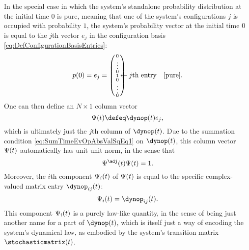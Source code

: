 \documentclass[12pt,english,prl,superscriptaddress,nobibnotes,nofootinbib]{revtex4-2}
\let\originalleft\left
\let\originalright\right
\renewcommand{\left}{\mathopen{}\mathclose\bgroup\originalleft}
\renewcommand{\right}{\aftergroup\egroup\originalright}
\begin{document}
In the special case in which the system's standalone probability distribution
at the initial time $0$ is pure, meaning that one of the system's
configurations $j$ is occupied with probability $1$, the system's
probability vector at the initial time $0$ is equal to the $j$th
vector $e_{j}$ in the configuration basis \eqref{eq:DefConfigurationBasisEntries}:
\begin{equation}
p\left(0\right)=e_{j}=\left(\begin{smallmatrix}0\\
\vdots\\
0\\
1\\
0\\
\vdots\\
0
\end{smallmatrix}\right)\negthickspace\negthickspace\negthickspace\negthickspace\leftarrow j\textrm{th entry}\quad\left[\textrm{pure}\right].\label{eq:PureInitialProbabilityVector}
\end{equation}
 One can then define an $N\times1$ column vector 
\begin{equation}
\Psi\left(t\right)\defeq\dynop\left(t\right)e_{j},\label{eq:DefStateVector}
\end{equation}
 which is ultimately just the $j$th column of $\dynop\left(t\right)$.
Due to the summation condition \eqref{eq:SumTimeEvOpAbsValSqEq1}
on $\dynop\left(t\right)$, this column vector $\Psi\left(t\right)$
automatically has unit unit norm, in the sense that 
\begin{equation}
\Psi^{\adj}\left(t\right)\Psi\left(t\right)=1.\label{eq:StateVectorUnitNorm}
\end{equation}
 Moreover, the $i$th component $\Psi_{i}\left(t\right)$ of $\Psi\left(t\right)$
is equal to the specific complex-valued matrix entry $\dynop_{ij}\left(t\right)$:
\begin{equation}
\Psi_{i}\left(t\right)=\dynop_{ij}\left(t\right).\label{eq:WaveFunctionFromTimeEvOpEntry}
\end{equation}
 This component $\Psi_{i}\left(t\right)$ is a purely law-like quantity,
in the sense of being just another name for a part of $\dynop\left(t\right)$,
which is itself just a way of encoding the system's dynamical law,
as embodied by the system's transition matrix $\stochasticmatrix\left(t\right)$.
\end{document}
